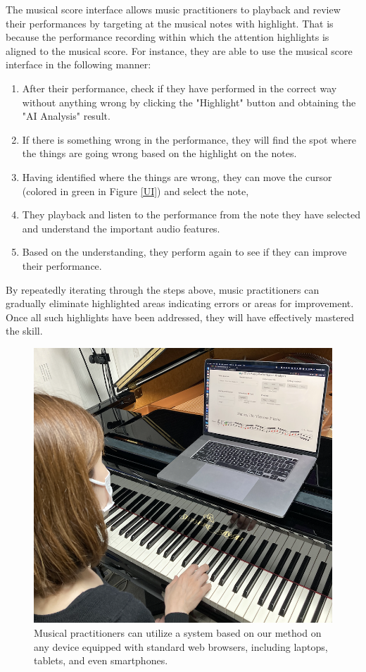 The musical score interface allows music practitioners to playback and review their performances by targeting at the musical notes with highlight. That is because the performance recording within which the attention highlights is aligned to the musical score.
For instance, they are able to use the musical score interface in the following manner:
\begin{enumerate}
   \item After their performance, check if they have performed in the correct way without anything wrong by clicking the "Highlight" button and obtaining the "AI Analysis" result.
   \item If there is something wrong in the performance, they will find the spot where the things are going wrong based on the highlight on the notes.
   \item Having identified where the things are wrong, they can move the cursor (colored in green in Figure \ref{UI}) and select the note,
   \item They playback and listen to the performance from the note they have selected and understand the important audio features.
   \item Based on the understanding, they perform again to see if they can improve their performance.
 \end{enumerate}
By repeatedly iterating through the steps above, music practitioners can gradually eliminate highlighted areas indicating errors or areas for improvement. 
Once all such highlights have been addressed, they will have effectively mastered the skill.

\begin{figure}[h!]
  \centering
  \includegraphics[width=\linewidth]{figures/system_usage_2224.png}
  \caption{Musical practitioners can utilize a system based on our method on any device equipped with standard web browsers, including laptops, tablets, and even smartphones.}
  \Description{}
  \label{system_usage}
\end{figure}

